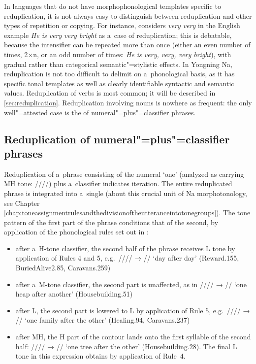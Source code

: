 In languages that do not have morphophonological templates specific to reduplication, it is not always easy to distinguish between reduplication and other types of repetition or copying. For instance, \citet[301]{moravcsik1978} considers \textit{very very} in the English example \textit{He is very very bright} as a~case of reduplication; this is debatable, because the intensifier can be repeated more than once (either an even number of times, 2×n, or an odd number of times: \textit{He is very, very, very bright}), with gradual rather than categorical semantic"=stylistic effects. In Yongning Na, reduplication is not too difficult to delimit on a~phonological basis, as it has specific tonal templates as well as clearly identifiable syntactic and semantic values. Reduplication of verbs is most common; it will be described in \ref{sec:reduplication}. Reduplication involving nouns is nowhere as frequent: the only well"=attested case is the  of numeral"=plus"=classifier phrases. 


\subsection{Reduplication of numeral"=plus"=classifier phrases}
\label{sec:numclred}

Reduplication of a~phrase consisting of the numeral ‘one’ (analyzed as carrying MH tone: ////) plus a~classifier indicates iteration. The entire reduplicated
phrase is integrated into a~single  (about this crucial unit of Na morphotonology, see Chapter \ref{chap:toneassignmentrulesandthedivisionoftheutteranceintotonegroups}). The tone pattern of the first part of the phrase
conditions that of the second, by application of the phonological rules set out in :

\begin{itemize}
	\item{after a~H-tone classifier, the second half of the phrase receives L
		tone by application of Rules 4 and 5, e.g.~//// → // ‘day after day’
		(Reward.155, BuriedAlive2.85, Caravans.259)}
	\item{after a~M-tone classifier, the second part is
		unaffected, as in //// → // ‘one heap after another’
		(Housebuilding.51)}
	\item{after L, the second part is lowered to L by application of Rule 5,
		e.g.~//// → // ‘one family after the other’ (Healing.94,
		Caravans.237)}
	\item{after MH, the H part of the contour lands onto the first syllable of the second half: //// →
		// ‘one tree after the other’ (Housebuilding.28). The final L tone in this expression obtains by application of Rule~4.}
\end{itemize}


